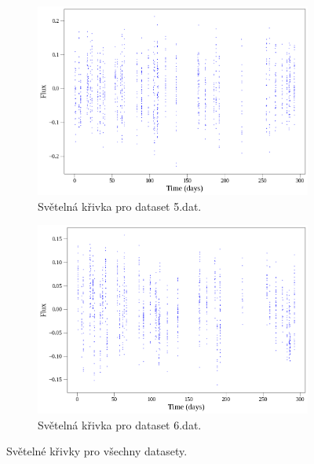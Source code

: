 \documentclass[a4paper,11pt,twocolumn]{article}
\begin{document}
\begin{figure}
\begin{subfigure}[t]{0.48\textwidth}
            \includegraphics[width=\textwidth]{lc/5_lc.png}
            \caption{Světelná křivka pro dataset 5.dat.}
            \label{fig:5_lc}
        \end{subfigure}
        \hfill
        \begin{subfigure}[t]{0.48\textwidth}
            \centering
            \includegraphics[width=\textwidth]{lc/6_lc.png}
            \caption{Světelná křivka pro dataset 6.dat.}
            \label{fig:6_lc}
        \end{subfigure}
        \caption{Světelné křivky pro všechny datasety.}
        \label{fig:all_lc}
    \end{figure}
\end{document}

